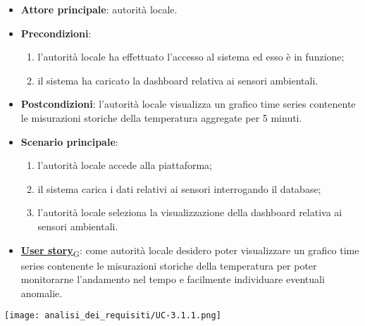 \begin{itemize}
	\item \textbf{Attore principale}: autorità locale.
	\item \textbf{Precondizioni}:
	      \begin{enumerate}
		      \item l'autorità locale ha effettuato l'accesso al sistema ed esso è in funzione;
		      \item il sistema ha caricato la dashboard relativa ai sensori ambientali.
	      \end{enumerate}
	\item \textbf{Postcondizioni}: l'autorità locale visualizza un grafico time series contenente le misurazioni storiche
	      della temperatura aggregate per 5 minuti.
	\item \textbf{Scenario principale}:
	      \begin{enumerate}
		      \item l'autorità locale accede alla piattaforma;
		      \item il sistema carica i dati relativi ai sensori interrogando il database;
		      \item l'autorità locale seleziona la visualizzazione della dashboard relativa ai sensori ambientali.
	      \end{enumerate}
	\item \href{https://7last.github.io/docs/pb/documentazione-interna/glossario\#user-story}{\textbf{User story}\textsubscript{G}}: come autorità locale desidero poter visualizzare un grafico time series contenente le misurazioni storiche della temperatura
	      per poter monitorarne l'andamento nel tempo e facilmente individuare eventuali anomalie.
\end{itemize}
\begin{center}
	\texttt{[image: analisi\_dei\_requisiti/UC-3.1.1.png]}
\end{center}


